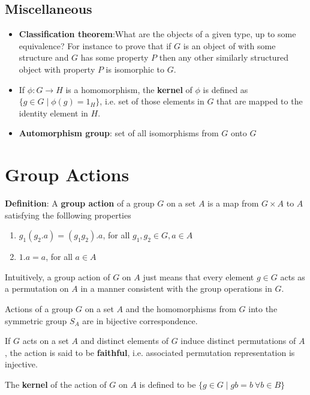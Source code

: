 \documentclass[titlepage, 12pt]{article}
\begin{document}
\subsection{Miscellaneous}
\begin{itemize}
    \item\textbf{Classification theorem}:What are the objects of a given type, up to some
    equivalence? For instance to prove that if $G$ is an object of with some
    structure and $G$ has some property $P$ then any other similarly structured
    object with property $P$ is isomorphic to $G$.

    \item If $\phi:G\rightarrow H$ is a homomorphism, the \textbf{kernel} of $\phi$ is
    defined as $\{g\in G\mid\phi(g) = 1_H\}$, i.e. set of those elements in $G$ that
    are mapped to the identity element in $H$.

    \item\textbf{Automorphism group}: set of all isomorphisms from $G$ onto $G$
\end{itemize}

\section{Group Actions}
\textbf{Definition}: A \textbf{group action} of a group $G$ on a set $A$ is a
map from $G\times A$ to $A$ satisfying the folllowing properties
\begin{enumerate}

    \item $g_1(g_2.a) = (g_1g_2).a$, for all $g_1, g_2\in G, a\in A$

    \item $1.a = a$, for all $a\in A$

\end{enumerate}

Intuitively, a group action of $G$ on $A$ just means that every element $g\in G$
acts as a permutation on $A$ in a manner consistent with the group operations in
$G$.

Actions of a group $G$ on a set $A$ and the homomorphisms from $G$ into the
symmetric group $S_A$ are in bijective correspondence.

If $G$ acts on a set $A$ and distinct elements of $G$ induce distinct
permutations of $A$, the action is said to be \textbf{faithful}, i.e. associated
permutation representation is injective.

The \textbf{kernel} of the action of $G$ on $A$ is defined to be $\{g\in G\mid
gb = b\ \forall b\in B\}$
\end{document}
